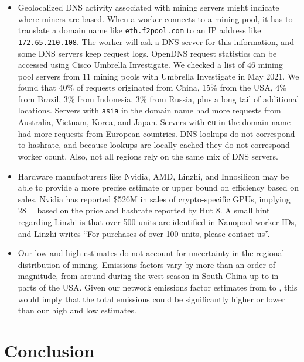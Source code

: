 \begin{itemize}
    \item Geolocalized DNS activity associated with mining servers might indicate where miners are based. When a worker connects to a mining pool, it has to translate a domain name like \texttt{eth.f2pool.com} to an IP address like \texttt{172.65.210.108}. The worker will ask a DNS server for this information, and some DNS servers keep request logs. OpenDNS request statistics can be accessed using Cisco Umbrella Investigate. We checked a list of 46 mining pool servers from 11 mining pools with Umbrella Investigate in May 2021. We found that 40\% of requests originated from China, 15\% from the USA, 4\% from Brazil, 3\% from Indonesia, 3\% from Russia, plus a long tail of additional locations. Servers with \texttt{asia} in the domain name had more requests from Australia, Vietnam, Korea, and Japan. Servers with \texttt{eu} in the domain name had more requests from European countries. DNS lookups do not correspond to hashrate, and because lookups are locally cached they do not correspond worker count. Also, not all regions rely on the same mix of DNS servers.
    
    \item Hardware manufacturers like Nvidia, AMD, Linzhi, and Innosilicon may be able to provide a more precise estimate or upper bound on efficiency based on sales. Nvidia has reported \$526M\cite{leswing_nvidia_2021} in sales of crypto-specific GPUs, implying \SI{28}{\tera\hps} based on the price and hashrate reported by Hut 8\cite{pan_ethereum_2021}. A small hint regarding Linzhi is that over 500 units are identified in Nanopool worker IDs, and Linzhi writes ``For purchases of over 100 units, please contact us''.
    
    \item Our low and high estimates do not account for uncertainty in the regional distribution of mining. Emissions factors vary by more than an order of magnitude, from around  during the west season in South China up to  in parts of the USA. Given our network emissions factor estimates from  to , this would imply that the total emissions could be significantly higher or lower than our high and low estimates.
    
\end{itemize}

\section{Conclusion}

